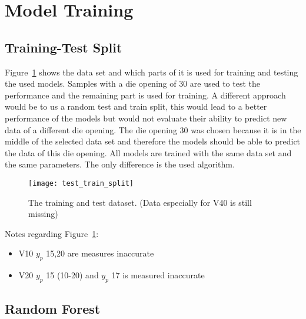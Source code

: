 \section{Model Training}

\subsection{Training-Test Split}
Figure~\ref{fig:train_test_split} shows the data set and which parts of it is used for training and testing the used models. Samples with a die opening of 30 are used to test the performance and the remaining part is used for training.
A different approach would be to us a random test and train split, this would lead to a better performance of the models but would not evaluate their ability to predict new data of a different die opening.
The die opening 30 was chosen because it is in the middle of the selected data set and therefore the models should be able to predict the data of this die opening.
All models are trained with the same data set and the same parameters. The only difference is the used algorithm.


\begin{figure}[H]
    \centering
    \texttt{[image: test\_train\_split]}
    \caption{The training and test dataset. (Data especially for V40 is still missing)}
    \label{fig:train_test_split}
\end{figure}

Notes regarding Figure~\ref*{fig:train_test_split}:
\begin{itemize}
    \item V10 $y_p$ 15,20 are measures inaccurate
    \item V20 $y_p$ 15 (10-20) and $y_p$ 17 is measured inaccurate
\end{itemize}

\subsection{Random Forest}

